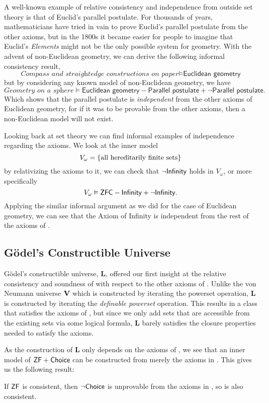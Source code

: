 A well-known example of relative consistency and independence from outside set theory is that of Euclid's parallel postulate.
For thousands of years, mathematicians have tried in vain to prove Euclid's parallel postulate from the other axioms,
but in the 1800s it became easier for people to imagine that Euclid's \emph{Elements} might not be the only possible system for geometry.
With the advent of non-Euclidean geometry, we can derive the following informal consistency result,
\[ \textit{Compass and straightedge constructions on paper} \models \textsf{Euclidean geometry} \]
but by considering any known model of non-Euclidean geometry, we have
\[ \textit{Geometry on a sphere} \models \textsf{Euclidean geometry} - \textsf{Parallel postulate} + \lnot\textsf{Parallel postulate}. \]
Which shows that the parallel postulate is \emph{independent} from the other axioms of Euclidean geometry,
for if it was to be provable from the other axioms, then a non-Euclidean model will not exist.

Looking back at set theory we can find informal examples of independence regarding the \ZFC axioms.
We look at the inner model \[V_\omega = {\left\{ \text{all hereditarily finite sets} \right\}}\]
by relativizing the \ZFC axioms to it, we can check that
\(\lnot{\normalfont\textsf{Infinity}}\) holds in \(V_\omega\),
or more specifically
\[ V_\omega \vDash \mbox{\normalfont \textsf{ZFC}} - {\normalfont\textsf{Infinity}} + \lnot {\normalfont\textsf{Infinity}}. \]
Applying the similar informal argument as we did for the case of Euclidean geometry,
we can see that the Axiom of Infinity is independent from the rest of the axioms of \ZFC.


\subsection{Gödel's Constructible Universe}
\label{subsection:constructible}

Gödel's constructible universe, \(\mathbf{L}\), offered our first insight at the relative consistency and soundness of  with respect to the other axioms of \ZF.
Unlike the von Neumann universe \(\mathbf{V}\) which is constructed by iterating the powerset operation,
\(\mathbf{L}\) is constructed by iterating the \emph{definable powerset} operation.
This results in a class that satisfies the axioms of \ZFC, but since we only add sets that are accessible from the existing sets via some logical formula, \(\mathbf{L}\) barely satisfies the closure properties needed to satisfy the \ZFC axioms.

As the construction of \(\mathbf{L}\) only depends on the axioms of \ZF,
we see that an inner model of \(\mbox{\normalfont \textsf{ZF}} + {\normalfont\textsf{Choice}}\) can be constructed from merely the axioms in \ZF.
This gives us the following result:
\begin{theorem}
    If \(\mbox{\normalfont \textsf{ZF}}\) is consistent, then \(\lnot{\normalfont\textsf{Choice}}\) is unprovable from the axioms in \ZF, so \ZFC is also consistent.
\end{theorem}

